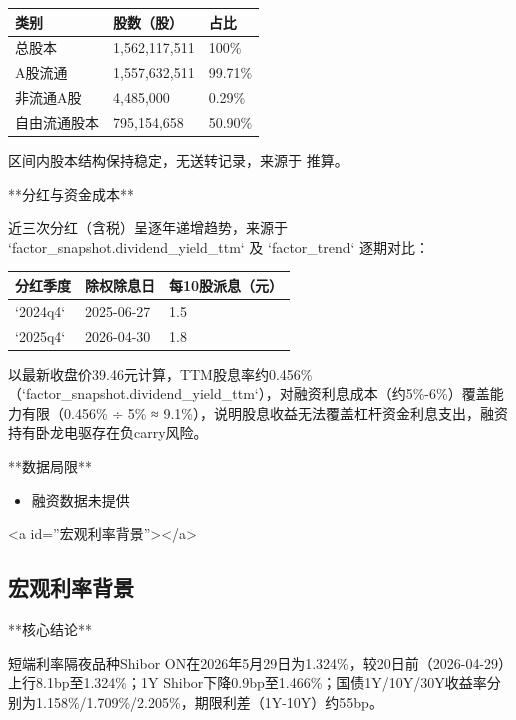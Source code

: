 \documentclass[12pt,a4paper]{article}
\begin{document}
\begin{table}[htbp]
\centering
\begin{tabular}{lll}
\toprule
类别 & 股数（股） & 占比 \\
\midrule
总股本 & 1,562,117,511 & 100\% \\
A股流通 & 1,557,632,511 & 99.71\% \\
非流通A股 & 4,485,000 & 0.29\% \\
自由流通股本 & 795,154,658 & 50.90\% \\
\bottomrule
\end{tabular}
\end{table}


区间内股本结构保持稳定，无送转记录，来源于 推算。

**分红与资金成本**

近三次分红（含税）呈逐年递增趋势，来源于 `factor\_snapshot.dividend\_yield\_ttm` 及 `factor\_trend` 逐期对比：

\begin{table}[htbp]
\centering
\begin{tabular}{lll}
\toprule
分红季度 & 除权除息日 & 每10股派息（元） \\
\midrule
`2024q4` & 2025-06-27 & 1.5 \\
`2025q4` & 2026-04-30 & 1.8 \\
\bottomrule
\end{tabular}
\end{table}


以最新收盘价39.46元计算，TTM股息率约0.456\%（`factor\_snapshot.dividend\_yield\_ttm`），对融资利息成本（约5\%-6\%）覆盖能力有限（0.456\% ÷ 5\% ≈ 9.1\%），说明股息收益无法覆盖杠杆资金利息支出，融资持有卧龙电驱存在负carry风险。

**数据局限**

\begin{itemize}
\item 融资数据未提供
\end{itemize}

<a id=''宏观利率背景''></a>

\subsection{ 宏观利率背景}

**核心结论**

短端利率隔夜品种Shibor ON在2026年5月29日为1.324\%，较20日前（2026-04-29）上行8.1bp至1.324\%；1Y Shibor下降0.9bp至1.466\%；国债1Y/10Y/30Y收益率分别为1.158\%/1.709\%/2.205\%，期限利差（1Y-10Y）约55bp。
\end{document}
